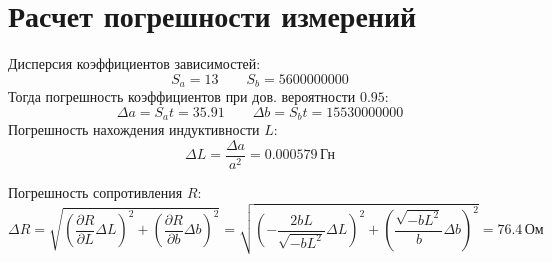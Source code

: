 \section{Расчет погрешности измерений}
Дисперсия коэффициентов зависимостей:
\[
	S_a = 13
	\qquad
	S_b = 5600000000
\]
Тогда погрешность коэффициентов при дов. вероятности \(0.95\):
\[
	\Delta a = S_a t = 35.91
	\qquad
	\Delta b = S_b t = 15530000000
\]
Погрешность нахождения индуктивности \(L\):
\[
	\Delta L = \frac{\Delta a}{a^2} = 0.000579 \, \text{Гн}
\]

Погрешность сопротивления \(R\):
\[
	\Delta R =
	\sqrt{ \left( \frac{\partial R}{\partial L} \Delta L \right)^2 + \left( \frac{\partial R}{\partial b} \Delta b \right)^2 } =
	\sqrt{ \left(- \frac{2 b L}{\sqrt{- b L^2}} \Delta L \right)^2 + \left( \frac{\sqrt{- b L^2}}{b} \Delta b \right)^2 } = 76.4 \, \text{Ом}
\]
